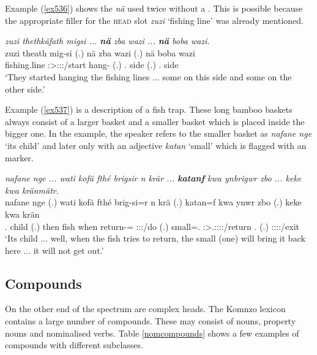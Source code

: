 Example (\ref{ex536}) shows the   \emph{nä} used twice without a . This is possible because the appropriate filler for the \textsc{head} slot \emph{zuzi} `fishing line' was already mentioned.

\begin{exe}
 	\ex \emph{zuzi thethkäfath migsi ... \textbf{nä} zba wazi ... \textbf{nä} boba wazi.}\\
 	\gll zuzi theath mig-si (.) nä zba wazi (.) nä boba wazi\\
	{fishing.line} \Stpl:\Sbj>\Stpl:\Obj:\Pst:\Pfv/start hang-\Nmlz{} (.) \Indf{} \Prox.\Abl{} side (.) \Indf{} \Med.\Abl{} side\\
 	\trans `They started hanging the fishing lines ... some on this side and some on the other side.'
 	\label{ex536}
\end{exe}

Example (\ref{ex537}) is a description of a fish trap. These long bamboo baskets always consist of a larger basket and a smaller basket which is placed inside the bigger one. In the example, the speaker refers to the smaller basket as \emph{nafane nge} `its child' and later only with an adjective \emph{katan} `small' which is flagged with an   marker.

\begin{exe}
 	\ex \emph{nafane nge ... wati kofä fthé brigsir n krär ... \textbf{katanf} kwa ynbrigwr zbo ... keke kwa kränmätr.}\\
 	\gll nafane nge (.) wati kofä fthé brig-si=r n krä (.) katan=f kwa ynwr zbo (.) keke kwa krän\\
 	\Tsg.\Poss{} child (.) then fish when return-\Nmlz=\Purp{} \Imn{} \Stsg:\Sbj:\Irr:\Pfv/do (.) small=\Erg.\Sg{} \Fut{} \Stsg:\Sbj>\Tsg.\Masc:\Obj:\Nonpast:\Ipfv:\Venit/return \Prox.\All{} (.) \Neg{} \Fut{} \Stsg:\Sbj:\Irr:\Pfv:\Venit/exit\\
 	\trans `Its child ... well, when the fish tries to return, the small (one) will bring it back here ... it will not get out.'
 	\label{ex537}
\end{exe}

\subsection{Compounds}\label{headcompounds}

On the other end of the spectrum are complex heads. The Komnzo lexicon contains a large number of  compounds. These may consist of nouns, property nouns and nominalised verbs. Table \ref{nomcompounds} shows a few examples of compounds with different  subclasses.

